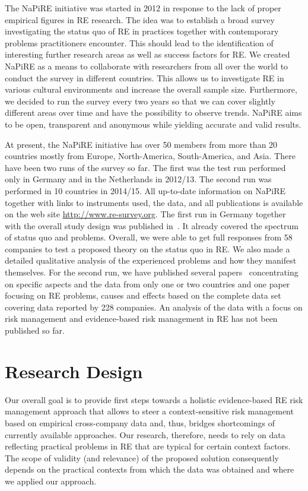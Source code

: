\documentclass[lnbip]{svmultln}
\begin{document}
The NaPiRE initiative was started in 2012 in response to the lack of proper empirical figures in RE research. The idea was to establish a broad survey investigating the status quo of RE in practices together with contemporary problems practitioners encounter. This should lead to the identification of interesting further research areas as well as success factors for RE. We created NaPiRE as a means to collaborate with researchers from all over the world to conduct the survey in different countries. This allows us to investigate RE in various cultural environments and increase the overall sample size. Furthermore, we decided to run the survey every two years so that we can cover slightly different areas over time and have the possibility to observe trends. NaPiRE aims to be open, transparent and anonymous while yielding accurate and valid results. 

At present, the NaPiRE initiative has over 50 members from more than 20 countries mostly from Europe, North-America, South-America, and Asia. There have been two runs of the survey so far. The first was the test run performed only in Germany and in the Netherlands in 2012/13. The second run was performed in 10 countries in 2014/15. All up-to-date information on NaPiRE together with links to instruments used, the data, and all publications is available on the web site \url{http://www.re-survey.org}. The first run in Germany together with the overall study design was published in~\cite{fernandez2015naming}. It already covered the spectrum of status quo and problems. Overall, we were able to get full responses from 58 companies to test a proposed theory on the status quo in RE. We also made a detailed qualitative analysis of the experienced problems and how they manifest themselves. For the second run, we have published several papers~\cite{kalinowski:seke15, mendez:softw15, kalinowski:swqd16, wagner2017requirements} concentrating on specific aspects and the data from only one or two countries and one paper~\cite{MW+16} focusing on RE problems, causes and effects based on the complete data set covering data reported by 228 companies. An analysis of the data with a focus on risk management and evidence-based risk management in RE has not been published so far.


\section{Research Design}
\label{sec:researchmethodology}

Our overall goal is to provide first steps towards a holistic evidence-based RE risk management approach that allows to steer a context-sensitive risk management based on empirical cross-company data and, thus, bridges shortcomings of currently available approaches. Our research, therefore, needs to rely on data reflecting practical problems in RE that are typical for certain context factors. The scope of validity (and relevance) of the proposed solution consequently depends on the practical contexts from which the data was obtained and where we applied our approach. 
\end{document}
